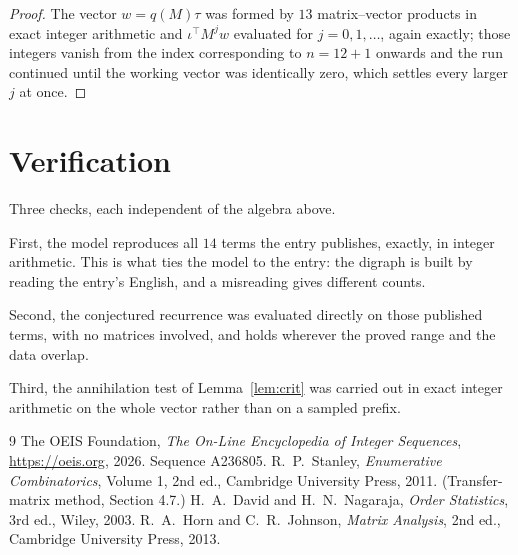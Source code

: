 \documentclass[11pt,a4paper]{article}
\theoremstyle{plain}
\theoremstyle{definition}
\begin{document}
\begin{proof}
The vector $w=q(M)\tau$ was formed by $13$ matrix--vector products in exact integer
arithmetic and $\iota^{\!\top}M^{j}w$ evaluated for $j=0,1,\dots$, again exactly; those
integers vanish from the index corresponding to $n=12+1$ onwards and the run continued
until the working vector was identically zero, which settles every larger $j$ at once.
\end{proof}

\section{Verification}

Three checks, each independent of the algebra above.

First, the model reproduces all $14$ terms the entry publishes, exactly, in integer
arithmetic. This is what ties the model to the entry: the digraph is built by reading the
entry's English, and a misreading gives different counts.

Second, the conjectured recurrence was evaluated directly on those published terms, with no
matrices involved, and holds wherever the proved range and the data overlap.

Third, the annihilation test of Lemma~\ref{lem:crit} was carried out in exact integer
arithmetic on the whole vector rather than on a sampled prefix.

\begin{thebibliography}{9}
 The OEIS Foundation, \emph{The On-Line Encyclopedia of Integer
Sequences}, \url{https://oeis.org}, 2026. Sequence A236805.
 R.~P.~Stanley, \emph{Enumerative Combinatorics}, Volume 1, 2nd ed.,
Cambridge University Press, 2011. (Transfer-matrix method, Section 4.7.)
 H.~A.~David and H.~N.~Nagaraja, \emph{Order Statistics}, 3rd ed., Wiley,
2003.
 R.~A.~Horn and C.~R.~Johnson, \emph{Matrix Analysis}, 2nd ed., Cambridge
University Press, 2013.
\end{thebibliography}
\end{document}
